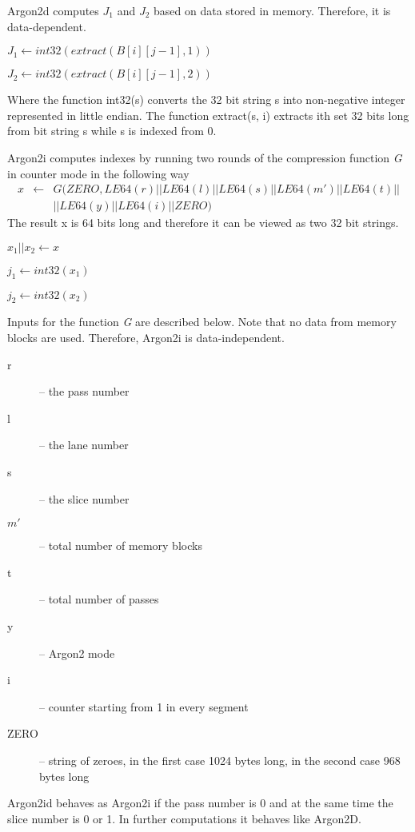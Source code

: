 \documentclass[nolof]{fithesis3}
\begin{document}
Argon2d computes \(J_1\) and \(J_2\) based on data stored in memory. Therefore, it is data-dependent.

\(J_1 \leftarrow int32(extract(B[i][j-1], 1))\)

\(J_2 \leftarrow int32(extract(B[i][j-1], 2))\)

Where the function int32(s) converts the 32 bit string s into non-negative integer represented in little endian. The function extract(s, i) extracts ith set 32 bits long from bit string s while s is indexed from 0.

Argon2i computes indexes by running two rounds of the compression function \emph{G} in counter mode in the following way
\begin{eqnarray*}
x &\leftarrow& G(ZERO, LE64(r) || LE64(l) || LE64(s) || LE64(m') || LE64(t) ||\\
 && || LE64(y) || LE64(i) || ZERO) 
\end{eqnarray*}
The result x is 64 bits long and therefore it can be viewed as two 32 bit strings.

\(x_1 || x_2 \leftarrow x\)

\(j_1 \leftarrow int32(x_1)\)

\(j_2 \leftarrow int32(x_2)\)

Inputs for the function \emph{G} are described below. Note that no data from memory blocks are used. Therefore, Argon2i is data-independent.

\begin{description}
\item[r] -- the pass number

\item[l] -- the lane number

\item[s] -- the slice number

\item[\(m'\)] -- total number of memory blocks

\item[t] -- total number of passes

\item[y] -- Argon2 mode

\item[i] -- counter starting from 1 in every segment

\item[ZERO] -- string of zeroes, in the first case 1024 bytes long, in the second case 968 bytes long
\end{description}

Argon2id behaves as Argon2i if the pass number is 0 and at the same time the slice number is 0 or 1. In further computations it behaves like Argon2D.
\end{document}
